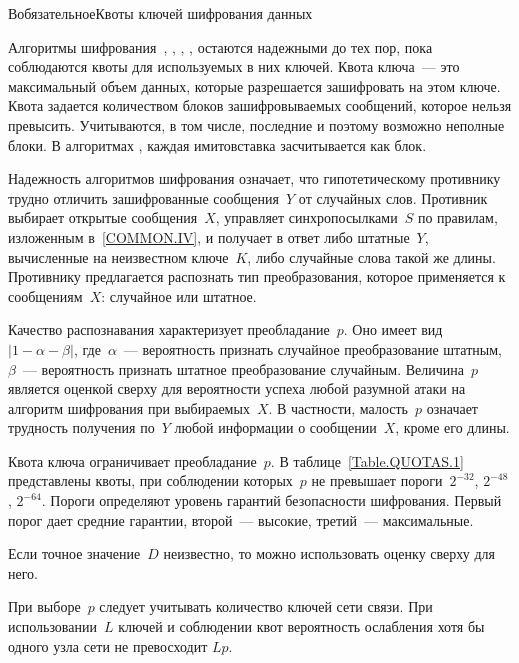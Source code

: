 \begin{appendix}{В}{обязательное}{Квоты ключей шифрования данных}\label{QUOTAS}

\mbox{}

Алгоритмы шифрования~, , 
, ,  остаются 
надежными до тех пор, пока соблюдаются квоты для используемых в них ключей.
%
Квота ключа~--- это максимальный объем данных, которые разрешается
зашифровать на этом ключе. Квота задается количеством блоков 
зашифровываемых сообщений, которое нельзя превысить. 
Учитываются, в том числе, последние и поэтому возможно неполные блоки. 
%
В алгоритмах ,  каждая имитовставка 
засчитывается как блок.

Надежность алгоритмов шифрования означает, что гипотетическому 
противнику трудно отличить зашифрованные сообщения~$Y$ от случайных слов. 
Противник выбирает открытые сообщения~$X$, управляет синхропосылками~$S$ 
по правилам, изложенным в~\ref{COMMON.IV}, и получает в ответ 
либо штатные~$Y$, вычисленные на неизвестном ключе~$K$, либо случайные слова 
такой же длины. Противнику предлагается распознать тип преобразования,
которое применяется к сообщениям~$X$: случайное или штатное. 

Качество распознавания характеризует преобладание~$p$.
Оно имеет вид~$|1-\alpha-\beta|$, 
где~$\alpha$~--- вероятность признать случайное преобразование штатным,
$\beta$~--- вероятность признать штатное преобразование случайным.
%
Величина~$p$ является оценкой сверху для вероятности успеха любой разумной атаки
на алгоритм шифрования при выбираемых~$X$. В частности, малость~$p$
означает трудность получения по~$Y$ любой информации о сообщении~$X$,
кроме его длины.

Квота ключа ограничивает преобладание~$p$.
%
В таблице~\ref{Table.QUOTAS.1} представлены квоты, 
при соблюдении которых~$p$ не превышает пороги~$2^{-32}$, $2^{-48}$, 
$2^{-64}$. Пороги определяют уровень гарантий безопасности шифрования.
Первый порог дает средние гарантии, 
второй~--- высокие, третий~--- максимальные.

\mbox{}

Если точное значение~$D$ неизвестно, то можно использовать оценку 
сверху для него.

При выборе~$p$ следует учитывать количество ключей сети связи.
При использовании~$L$ ключей и соблюдении квот вероятность
ослабления хотя бы одного узла сети не превосходит $Lp$.
\fi


\end{appendix}
